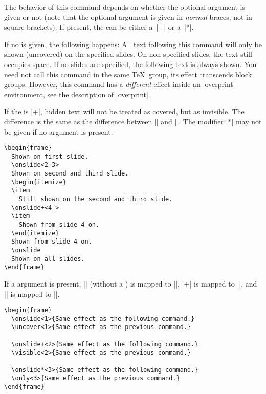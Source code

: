\begin{command}{\onslide{}}
  The behavior of this command depends on whether the optional argument  is given or not (note that the optional argument is given in \emph{normal} braces, not in square brackets). If present, the  can be either a~|+| or a~|*|.

  If no  is given, the following happens: All text following this command will only be shown  (uncovered) on the specified slides. On non-specified slides, the text still occupies space. If no slides are specified, the following text is always shown. You need not call this command in the same \TeX\ group, its effect transcends block groups. However, this command has a \emph{different} effect inside an |overprint| environment, see the description of |overprint|.

  If the  is |+|, hidden text will not be treated as covered, but as invisible. The difference is the same as the difference between |\uncover| and |\visible|. The modifier |*| may not be given if no  argument is present.

  \example
\begin{verbatim}
\begin{frame}
  Shown on first slide.
  \onslide<2-3>
  Shown on second and third slide.
  \begin{itemize}
  \item
    Still shown on the second and third slide.
  \onslide+<4->
  \item
    Shown from slide 4 on.
  \end{itemize}
  Shown from slide 4 on.
  \onslide
  Shown on all slides.
\end{frame}
\end{verbatim}

  If a  argument is present, |\onslide| (without a ) is mapped to |\uncover|, |\onslide+| is mapped to |\visible|, and |\onslide*| is mapped to |\only|.

  \example
\begin{verbatim}
\begin{frame}
  \onslide<1>{Same effect as the following command.}
  \uncover<1>{Same effect as the previous command.}

  \onslide+<2>{Same effect as the following command.}
  \visible<2>{Same effect as the previous command.}

  \onslide*<3>{Same effect as the following command.}
  \only<3>{Same effect as the previous command.}
\end{frame}
\end{verbatim}
\end{command}

